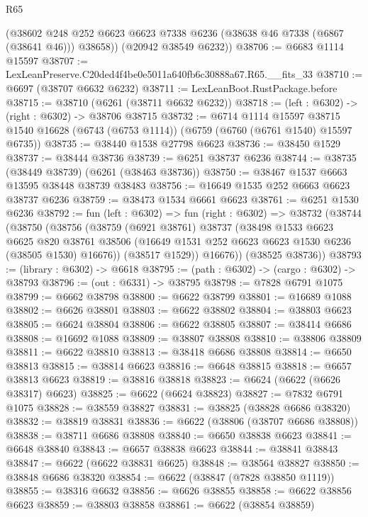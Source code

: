 \begin{lexlean}{R65}
\begin{coremodule}
{        (@38602 @248 @252 @6623 @6623 @7338 @6236 (@38638 @46 @7338 (@6867 (@38641 @46))) @38658))
      (@20942 @38549 @6232))
@38706 := @6683 @1114 @15597
@38707 := LexLeanPreserve.C20ded4f4be0e5011a640fb6c30888a67.R65.__fits_33
@38710 := @6697 (@38707 @6632 @6232)
@38711 := LexLeanBoot.RustPackage.before
@38715 := @38710 (@6261 (@38711 @6632 @6232))
@38718 := (left : @6302) -> (right : @6302) -> @38706 @38715
@38732 := @6714
    @1114
    @15597
    @38715
    @1540
    @16628
    (@6743 (@6753 @1114))
    (@6759 (@6760 (@6761 @1540) @15597 @6735))
@38735 := @38440 @1538 @27798 @6623
@38736 := @38450 @1529
@38737 := @38444 @38736
@38739 := @6251 @38737 @6236
@38744 := @38735 (@38449 @38739) (@6261 (@38463 @38736))
@38750 := @38467 @1537 @6663 @13595 @38448 @38739 @38483
@38756 := @16649 @1535 @252 @6663 @6623 @38737 @6236
@38759 := @38473 @1534 @6661 @6623
@38761 := @6251 @1530 @6236
@38792 := fun (left : @6302) =>
  fun (right : @6302) =>
  @38732
    (@38744
      (@38750
        (@38756
          (@38759
            (@6921 @38761)
            @38737
            (@38498
              @1533
              @6623
              @6625
              @820
              @38761
              @38506
              (@16649 @1531 @252 @6623 @6623 @1530 @6236 (@38505 @1530) @16676))
            (@38517 @1529))
          @16676))
      (@38525 @38736))
@38793 := (library : @6302) -> @6618
@38795 := (path : @6302) -> (cargo : @6302) -> @38793
@38796 := (out : @6331) -> @38795
@38798 := @7828 @6791 @1075
@38799 := @6662 @38798
@38800 := @6622 @38799
@38801 := @16689 @1088
@38802 := @6626 @38801
@38803 := @6622 @38802
@38804 := @38803 @6623
@38805 := @6624 @38804
@38806 := @6622 @38805
@38807 := @38414 @6686
@38808 := @16692 @1088
@38809 := @38807 @38808
@38810 := @38806 @38809
@38811 := @6622 @38810
@38813 := @38418 @6686 @38808
@38814 := @6650 @38813
@38815 := @38814 @6623
@38816 := @6648 @38815
@38818 := @6657 @38813 @6623
@38819 := @38816 @38818
@38823 := @6624 (@6622 (@6626 @38317) @6623)
@38825 := @6622 (@6624 @38823)
@38827 := @7832 @6791 @1075
@38828 := @38559 @38827
@38831 := @38825 (@38828 @6686 @38320)
@38832 := @38819 @38831
@38836 := @6622 (@38806 (@38707 @6686 @38808))
@38838 := @38711 @6686 @38808
@38840 := @6650 @38838 @6623
@38841 := @6648 @38840
@38843 := @6657 @38838 @6623
@38844 := @38841 @38843
@38847 := @6622 (@6622 @38831 @6625)
@38848 := @38564 @38827
@38850 := @38848 @6686 @38320
@38854 := @6622 (@38847 (@7828 @38850 @1119))
@38855 := @38316 @6632
@38856 := @6626 @38855
@38858 := @6622 @38856 @6623
@38859 := @38803 @38858
@38861 := @6622 (@38854 @38859)
}
\end{coremodule}
\end{lexlean}
